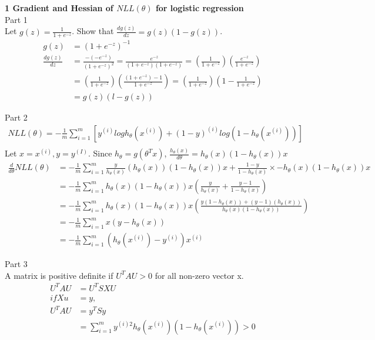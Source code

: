 \documentclass[12pt]{article}
\begin{document}
\noindent \textbf{1 Gradient and Hessian of $NLL(\theta)$ for logistic regression} \\
\noindent Part 1\\
	\indent Let $g(z) = \frac{1}{1+e^{-z}}$. Show that $\frac{dg(z)}{dz} = g(z)(1-g(z))$.
	\begin{align*}
	g(z) &= (1+e^{-z})^{-1} \\
	\frac{dg(z)}{dz} &= \frac{-(-e^{-z})}{(1+e^{-z})^{2}} = \frac{e^{-z}}{(1+e^{-z})(1+e^{-z})} = \left(\frac{1}{1+e^{-z}}\right)\left(\frac{e^{-z}}{1+e^{-z}}\right)\\
	&= \left(\frac{1}{1+e^{-z}}\right)\left(\frac{(1+e^{-z})-1}{1+e^{-z}}\right) =  \left(\frac{1}{1+e^{-z}}\right)\left(1-\frac{1}{1+e^{-z}}\right)\\
	&= g(z)(l-g(z))
	\end{align*}

\noindent Part 2\\
	\begin{align*}
	NLL(\theta) = -\frac{1}{m} \sum_{i=1}^m [y^{(i)}logh_{\theta}(x^{(i)})+(1-y)^{(i)}log(1-h_{\theta}(x^{(i)}))]\\
	\end{align*}
	\indent Let $x = x^{(i)}, y = y^{(I)}$. Since $h_{\theta} = g(\theta^{T}x)$, $\frac{h_{\theta}(x)}{d\theta} = h_{\theta}(x)(1-h_{\theta}(x))x$
	\begin{align*}
	\frac{d}{d\theta}NLL(\theta) &= -\frac{1}{m} \sum_{i=1}^m \frac{y}{h_{\theta}(x)}(h_{\theta}(x))(1-h_{\theta}(x))x + \frac{1-y}{1-h_{\theta}(x)}\times -h_{\theta}(x)(1-h_{\theta}(x))x\\
	&= -\frac{1}{m} \sum_{i=1}^m h_{\theta}(x)(1-h_{\theta}(x))x\left(\frac{y}{h_{\theta}(x)}+\frac{y-1}{1-h_{\theta}(x)}\right)\\
	&= -\frac{1}{m} \sum_{i=1}^m h_{\theta}(x)(1-h_{\theta}(x))x \left(\frac{y(1-h_{\theta}(x))+(y-1)(h_{\theta}(x))}{h_{\theta}(x)(1-h_{\theta}(x))}\right)\\
	&= -\frac{1}{m} \sum_{i=1}^m x(y-h_{\theta}(x))\\
	&= -\frac{1}{m} \sum_{i=1}^m(h_{\theta}(x^{(i)})-y^{(i)})x^{(i)}
	\end{align*}
	
\noindent Part 3\\
\indent A matrix is positive definite if $U^{T}AU>0$ for all non-zero vector x. 
	\begin{align*}
	U^{T}AU &= U^{T}SXU\\
	if Xu &= y,\\
	U^{T}AU &= y^{T}Sy\\
	&= \sum_{i=1}^m y^{(i)2}h_{\theta}(x^{(i)})(1-h_{\theta}(x^{(i)})) >0
	\end{align*}\\
	
\end{document}
